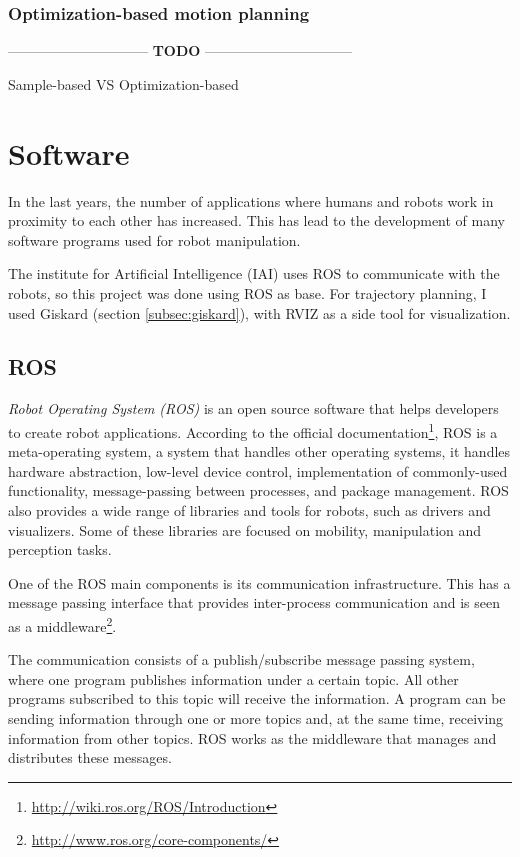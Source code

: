 \subsubsection{Optimization-based motion planning}

------------------------------ \textbf{TODO} --------------------------------

Sample-based VS Optimization-based

\section{Software}
In the last years, the number of applications where humans and robots work in proximity to each other has increased. This has lead to the development of many software programs used for robot manipulation. 

The  institute for Artificial Intelligence (IAI) uses ROS to communicate with the robots, so this project was done using ROS as base. For trajectory planning, I used Giskard (section \ref{subsec:giskard}), with RVIZ as a side tool for visualization.

\subsection{ROS}
\label{sec:ros}

\textit{Robot Operating System (ROS)} is an open source software that helps developers to create robot applications. According to the official documentation\footnote{\url{http://wiki.ros.org/ROS/Introduction}}, ROS is a meta-operating system, a system that handles other operating systems, it handles hardware abstraction, low-level device control, implementation of commonly-used functionality, message-passing between processes, and package management. ROS also provides a wide range of libraries and tools for robots, such as drivers and visualizers. Some of these libraries are focused on mobility, manipulation and perception tasks.

One of the ROS main components is its communication infrastructure. This has a message passing interface that provides inter-process communication and is seen as a middleware\footnote{\url{http://www.ros.org/core-components/}}. 

The communication consists of a publish/subscribe message passing system, where one program publishes information under a certain topic. All other programs subscribed to this topic will receive the information. A program can be sending information through one or more topics and, at the same time, receiving information from other topics. ROS works as the middleware that manages and distributes these messages.

